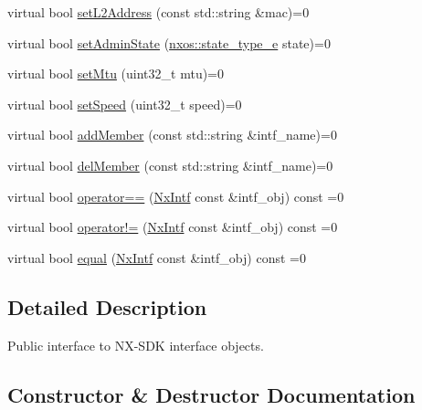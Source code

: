 \begin{DoxyCompactItemize}
\item 
virtual bool \mbox{\hyperlink{classnxos_1_1_nx_intf_a90a3cca36e76717085fecf575e815139}{set\+L2\+Address}} (const std\+::string \&mac)=0
\item 
virtual bool \mbox{\hyperlink{classnxos_1_1_nx_intf_a2244d9def0a3538d1f66f8816ad8b545}{set\+Admin\+State}} (\mbox{\hyperlink{nx__common_8h_a7c257059d03188765435b36e95dbb764}{nxos\+::state\+\_\+type\+\_\+e}} state)=0
\item 
virtual bool \mbox{\hyperlink{classnxos_1_1_nx_intf_ae2790907b869c62c01567452d66d03f9}{set\+Mtu}} (uint32\+\_\+t mtu)=0
\item 
virtual bool \mbox{\hyperlink{classnxos_1_1_nx_intf_ad42e229fc4c3aa9111b3a8805d55588c}{set\+Speed}} (uint32\+\_\+t speed)=0
\item 
virtual bool \mbox{\hyperlink{classnxos_1_1_nx_intf_a499756ef5447cd4037d095a444aefc99}{add\+Member}} (const std\+::string \&intf\+\_\+name)=0
\item 
virtual bool \mbox{\hyperlink{classnxos_1_1_nx_intf_a6886f3b84e843069a5fdf5434b061f80}{del\+Member}} (const std\+::string \&intf\+\_\+name)=0
\item 
virtual bool \mbox{\hyperlink{classnxos_1_1_nx_intf_a132f11f6cf7b6d93af1c9e565dc853c5}{operator==}} (\mbox{\hyperlink{classnxos_1_1_nx_intf}{Nx\+Intf}} const \&intf\+\_\+obj) const =0
\item 
virtual bool \mbox{\hyperlink{classnxos_1_1_nx_intf_aa0b5180978bbdcb3da2f18ed9bef089c}{operator!=}} (\mbox{\hyperlink{classnxos_1_1_nx_intf}{Nx\+Intf}} const \&intf\+\_\+obj) const =0
\item 
virtual bool \mbox{\hyperlink{classnxos_1_1_nx_intf_a3121854504b3d9828f75e3d47f50d7f8}{equal}} (\mbox{\hyperlink{classnxos_1_1_nx_intf}{Nx\+Intf}} const \&intf\+\_\+obj) const =0
\end{DoxyCompactItemize}


\subsection{Detailed Description}
Public interface to N\+X-\/\+S\+DK interface objects. 

\subsection{Constructor \& Destructor Documentation}
\mbox{\label{classnxos_1_1_nx_intf_a10fbaca5467637b238b8a4f1f1aa75e0}} 
